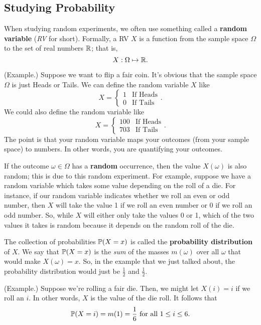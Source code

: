 \documentclass[letterpaper]{article}
\begin{document}
\subsection{Studying Probability}
When studying random experiments, we often use something called a \textbf{random variable} (\emph{RV} for short). Formally, a RV $X$ is a function from the sample space $\Omega$ to the set of real numbers $\mathbb{R}$; that is,
\[X: \Omega \mapsto \mathbb{R}.\]
\begin{mdframed}[]
    (Example.) Suppose we want to flip a fair coin. It's obvious that the sample space $\Omega$ is just Heads or Tails. We can define the random variable $X$ like
    \[X = \begin{cases}
        1 & \text{If Heads} \\ 
        0 & \text{If Tails}
    \end{cases}.\]
    We could also define the random variable like 
    \[X = \begin{cases}
        100 & \text{If Heads} \\ 
        703 & \text{If Tails}
    \end{cases}.\]
    The point is that your random variable maps your outcomes (from your sample space) to numbers. In other words, you are quantifying your outcomes. 
\end{mdframed}
If the outcome $\omega \in \Omega$ has a \textbf{random} occurrence, then the value $X(\omega)$ is also random; this is due to this random experiment. For example, suppose we have a random variable which takes some value depending on the roll of a die. For instance, if our random variable indicates whether we roll an even or odd number, then $X$ will take the value 1 if we roll an even number or 0 if we roll an odd number. So, while $X$ will either only take the values 0 or 1, which of the two values it takes is random because it depends on the random roll of the die. 

\bigskip 

The collection of probabilities $\mathbb{P}(X = x)$ is called the \textbf{probability distribution} of $X$. We say that $\mathbb{P}(X = x)$ is the \emph{sum} of the masses $m(\omega)$ over all $\omega$ that would make $X(\omega) = x$. So, in the example that we just talked about, the probability distribution would just be $\frac{1}{2}$ and $\frac{1}{2}$. 

\begin{mdframed}[]
    (Example.) Suppose we're rolling a fair die. Then, we might let $X(i) = i$ if we roll an $i$. In other words, $X$ is the value of the die roll. It follows that 
    \[\mathbb{P}(X = i) = m(1) = \frac{1}{6} \text{ for all } 1 \leq i \leq 6.\]
\end{mdframed}
\end{document}
